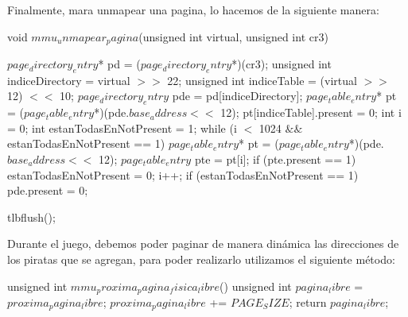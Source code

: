 Finalmente, mara unmapear una pagina, lo hacemos de la siguiente manera:
\begin{algorithmic}

\State \tab void $mmu_unmapear_pagina$(unsigned int virtual, unsigned int cr3) {
  \State \tab \tab $page_directory_entry$* pd = ($page_directory_entry$*)(cr3);
  \State \tab \tab unsigned int indiceDirectory = virtual $>>$ 22;
  \State \tab \tab unsigned int indiceTable = (virtual $>>$ 12) $<<$ 10;
  \State \tab \tab $page_directory_entry$ pde = pd[indiceDirectory];
  \State \tab \tab $page_table_entry$* pt = ($page_table_entry$*)(pde.$base_address <<$ 12);
  \State \tab \tab pt[indiceTable].present = 0;
  \State \tab \tab int i = 0;
  \State \tab \tab int estanTodasEnNotPresent = 1;
  \State \tab \tab while (i $<$ 1024 $\&\&$ estanTodasEnNotPresent == 1) {
    \State \tab \tab \tab $page_table_entry$* pt = ($page_table_entry$*)(pde.$base_address <<$ 12);
    \State \tab \tab \tab $page_table_entry$ pte = pt[i];
    \State \tab \tab \tab if (pte.present == 1) {
      \State \tab \tab \tab \tab estanTodasEnNotPresent = 0;
    \State \tab \tab \tab }
    \State \tab \tab \tab i++;
  \State \tab \tab }
  \State \tab \tab if (estanTodasEnNotPresent == 1) {
    \State \tab \tab \tab pde.present = 0;
  \State \tab \tab  }

  \State \tab \tab tlbflush();
\State \tab  }
\end{algorithmic}

Durante el juego, debemos poder paginar de manera din\'amica las direcciones de los piratas que se agregan, para poder realizarlo utilizamos el siguiente m\'etodo:
\begin{algorithmic}
    \State \tab unsigned int $mmu_proxima_pagina_fisica_libre$() {
  \State \tab \tab unsigned int $pagina_libre$ = $proxima_pagina_libre$;
  \State \tab \tab $proxima_pagina_libre$ += $PAGE_SIZE$;
  \State \tab \tab return $pagina_libre$;
\State \tab }
\end{algorithmic}

















